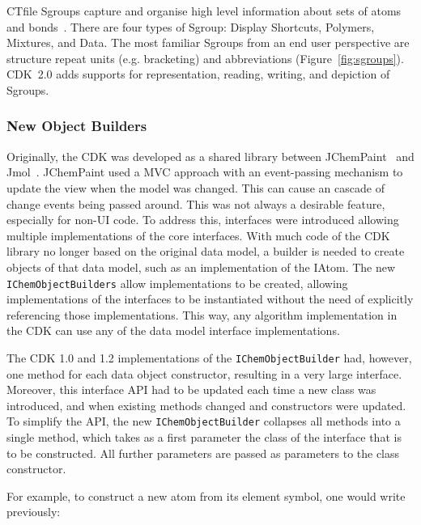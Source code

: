 \documentclass[10pt]{bmcart}
\def \cdkversion {2.0}
\begin{document}
CTfile Sgroups capture and organise high level information about sets of atoms
and bonds~\cite{Gushurst91}. There are four types of Sgroup: Display Shortcuts, Polymers,
Mixtures, and Data. The most familiar Sgroups from an end user perspective are structure 
repeat units (e.g. bracketing) and abbreviations (Figure~\ref{fig:sgroups}).
CDK~\cdkversion{} adds 
supports for representation, reading, writing, and depiction of Sgroups.


\subsubsection*{New Object Builders}

Originally, the CDK was developed as a shared library between
JChemPaint~\cite{krause2000jchempaint} and
Jmol~\cite{Willighagen2007jmol,Hanson2010}.  JChemPaint used a MVC
approach with an event-passing mechanism to update the view when the
model was changed. This can cause an cascade of change events being
passed around. This was not always a desirable feature, especially for
non-UI code. To address this, interfaces were introduced allowing
multiple implementations of the core interfaces. With much code of the CDK
library no longer based on the original data model, a builder is needed to
create objects of that data model, such as an implementation of the IAtom.
The new \texttt{IChemObjectBuilders} allow implementations to be created, allowing
implementations of the interfaces to be instantiated without the need
of explicitly referencing those implementations. This way, any algorithm
implementation in the CDK can use any of the data model interface
implementations.

The CDK 1.0 and 1.2 implementations of the \texttt{IChemObjectBuilder} had,
however, one method for each data object constructor, resulting in a very large
interface. Moreover, this interface API had to be updated each time a new class
was introduced, and when existing methods changed and constructors were updated.
To simplify the API, the new \texttt{IChemObjectBuilder} collapses all methods
into a single method, which takes as a first parameter the class of the
interface that is to be constructed. All further parameters are passed as
parameters to the class constructor.

For example, to construct a new atom from its element symbol, one
would write previously:
\end{document}
